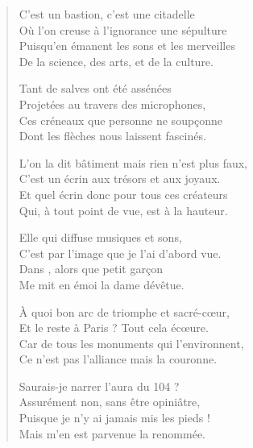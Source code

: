 \begin{verse}%
  \quatrain%
  C’est un bastion, c’est une citadelle\\  %
  Où l’on creuse à l’ignorance une sépulture\\  %
  Puisqu’en émanent les sons et les merveilles\\  %
  De la science, des arts, et de la culture.

  Tant de salves ont été assénées\\  %
  Projetées au travers des microphones,\\  %
  Ces créneaux que personne ne soupçonne\\  %
  Dont les flèches nous laissent fascinés.

  L’on la dit bâtiment mais rien n’est plus faux,\\  %
  C’est un écrin aux trésors et aux joyaux.\\  %
  Et quel écrin donc pour tous ces créateurs\\  %
  Qui, à tout point de vue, est à la hauteur.

  Elle qui diffuse musiques et sons,\\  %
  C’est par l’image que je l’ai d’abord vue.\\  %
  Dans , alors que petit garçon\\
  Me mit en émoi la dame dévêtue.

  À quoi bon arc de triomphe et sacré-cœur,\\  %
  Et le reste à Paris ? Tout cela écœure.\\  %
  Car de tous les monuments qui l’environnent,\\  %
  Ce n’est pas l’alliance mais la couronne.

  Saurais-je narrer l’aura du 104 ?\\  %
  Assurément non, sans être opiniâtre,\\  %
  Puisque je n’y ai jamais mis les pieds !\\  %
  Mais m’en est parvenue la renommée.


\end{verse}
